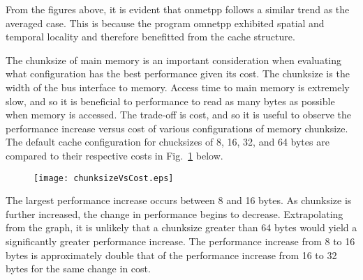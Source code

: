 \documentclass[FinalReport.tex]{subfiles}
\begin{document}
From the figures above, it is evident that onmetpp follows a similar trend as the averaged case.  This is because the program omnetpp exhibited spatial and temporal locality and therefore benefitted from the cache structure.

 The chunksize of main memory is an important consideration when evaluating what configuration has the best performance given its cost. The chunksize is the width of the bus interface to memory. Access time to main memory is extremely slow, and so it is beneficial to performance to read as many bytes as possible when memory is accessed. The trade-off is cost, and so it is useful to observe the performance increase versus cost of various configurations of memory chunksize. The default cache configuration for chucksizes of 8, 16, 32, and 64 bytes are compared to their respective costs in Fig.~\ref{fig:chunksizes} below.
 
\begin{figure}[H]
\centering
\texttt{[image: chunksizeVsCost.eps]}
\caption{\label{fig:chunksizes}}
\end{figure}

The largest performance increase occurs between 8 and 16 bytes. As chunksize is further increased, the change in performance begins to decrease. Extrapolating from the graph, it is unlikely that a chunksize greater than 64 bytes would yield a significantly greater performance increase. The performance increase from 8 to 16 bytes is approximately double that of the performance increase from 16 to 32 bytes for the same change in cost.
\end{document}
